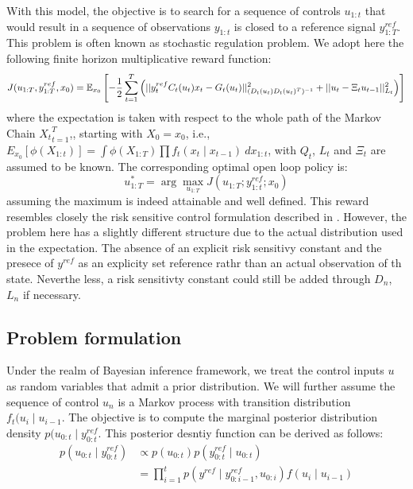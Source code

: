 
With this model, the objective is to search for a sequence of controls $u_{1:t}$ that would result in a sequence of observations $y_{1:t}$ is closed to a reference signal $y^{ref}_{1:T}$. This problem is often known as stochastic regulation problem. We adopt here the following finite horizon multiplicative reward function:
\begin{equation}
  J(u_{1:T},y^{ref}_{1:T}, x_0) = \operatorname{\mathbb{E}}_{x_0}\left[ -\dfrac{1}{2}\displaystyle\sum^T_{t=1}\left(\vert\vert y^{ref}_t C_t(u_t)x_t - G_t(u_t) \vert\vert^2_{(D_t(u_t)D_t(u_t)^T)^{-1}}  + \vert\vert u_t - \Xi_t u_{t-1} \vert\vert^2_{L_t}\right) \right]
\end{equation}
where the expectation is taken with respect to the whole path of the Markov Chain ${X_t}^T_{t=1}$,, starting with $X_0 = x_0$,  i.e., $E_{x_0}[\phi(X_{1:t})] = \int \phi(X_{1:T}) \prod f_t(x_t \mid x_{t-1})~dx_{1:t}$, with $Q_t$, $L_t$ and $\Xi_t$ are assumed to be known. The corresponding optimal open loop policy is:
\begin{equation}
  u^*_{1:T} = \arg\max_{u_{1:T}} J(u_{1:T};y^{ref}_{1:t};x_0)
\end{equation}
assuming the maximum is indeed attainable and well defined. This reward resembles closely the risk sensitive control formulation described in \cite{}. However, the problem here has a slightly different structure due to the actual distribution used in the expectation. The absence of an explicit risk sensitivy constant and the presece of $y^{ref}$ as an explicity set reference rathr than an actual observation of th state. Neverthe less, a risk sensitivty constant could still be added through $D_n$, $L_n$ if necessary.

\subsection{Problem formulation}
Under the realm of Bayesian inference framework, we treat the control inputs $u$ as random variables that admit a prior distribution. We will further assume the sequence of control $u_n$ is a Markov process with transition distribution $f_t(u_i \mid u_{i-1}$. The objective is to compute the marginal posterior distribution density $p(u_{0:t} \mid y^{ref}_{0:t}$. This posterior desntiy function can be derived as follows:
\begin{align}
p(u_{0:t} \mid y^{ref}_{0:t}) &\propto p(u_{0:t}) p(y^{ref}_{0:t} \mid u_{0:t}) \\
&= \prod^t_{i=1} p(y^{ref} \mid y^{ref}_{0:i-1}, u_{0:i}) f(u_i \mid u_{i-1})
\end{align}

